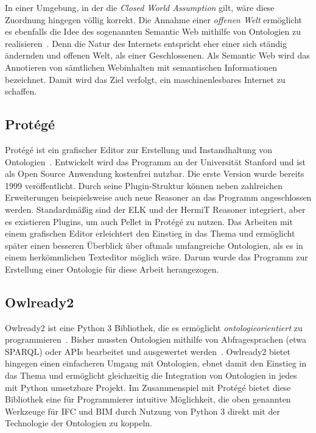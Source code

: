 In einer Umgebung, in der die \textit{Closed World Assumption} gilt, wäre diese Zuordnung hingegen völlig korrekt.
Die Annahme einer \textit{offenen Welt} ermöglicht es ebenfalls die Idee des sogenannten \glqq{}Semantic Web\grqq{} mithilfe von Ontologien zu realisieren~\cite{SemanticWebLee}.
Denn die Natur des Internets entspricht eher einer sich ständig ändernden und offenen Welt, als einer Geschlossenen.
Als Semantic Web wird das Annotieren von sämtlichen Webinhalten mit semantischen Informationen bezeichnet.
Damit wird das Ziel verfolgt, ein maschinenlesbares Internet zu schaffen. 

\subsection{Protégé}\label{basics:protege}
Protégé ist ein grafischer Editor zur Erstellung und Instandhaltung von Ontologien~\cite{Protege}.
Entwickelt wird das Programm an der Universität Stanford und ist als Open Source Anwendung kostenfrei nutzbar.
Die erste Version wurde bereits 1999 veröffentlicht.
Durch seine Plugin-Struktur können neben zahlreichen Erweiterungen beispielsweise auch neue Reasoner an das Programm angeschlossen werden.
Standardmäßig sind der ELK und der HermiT Reasoner integriert, aber es existieren Plugins, um auch Pellet in Protégé zu nutzen.
Das Arbeiten mit einem grafischen Editor erleichtert den Einstieg in das Thema und ermöglicht später einen besseren Überblick über oftmals umfangreiche Ontologien, als es in einem herkömmlichen Texteditor möglich wäre.
Darum wurde das Programm zur Erstellung einer Ontologie für diese Arbeit herangezogen.

\subsection{Owlready2}\label{basics:owlready}
Owlready2 ist eine Python 3 Bibliothek, die es ermöglicht \textit{ontologieorientiert} zu programmieren~\cite{Owlready}.
Bisher mussten Ontologien mithilfe von Abfragesprachen (etwa SPARQL) oder APIs bearbeitet und ausgewertet werden~\cite{SPARQLF_W3C}.
Owlready2 bietet hingegen einen einfacheren Umgang mit Ontologien, ebnet damit den Einstieg in das Thema und ermöglicht gleichzeitig die Integration von Ontologien in jedes mit Python umsetzbare Projekt.
Im Zusammenspiel mit Protégé bietet diese Bibliothek eine für Programmierer intuitive Möglichkeit, die oben genannten Werkzeuge für IFC und BIM durch Nutzung von Python 3 direkt mit der Technologie der Ontologien zu koppeln.
